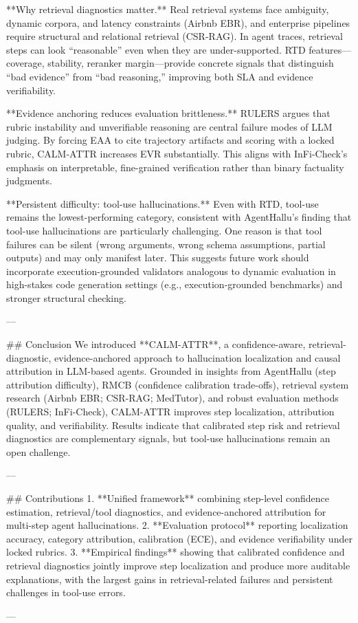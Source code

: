 **Why retrieval diagnostics matter.** Real retrieval systems face ambiguity, dynamic corpora, and latency constraints (Airbnb EBR), and enterprise pipelines require structural and relational retrieval (CSR-RAG). In agent traces, retrieval steps can look “reasonable” even when they are under-supported. RTD features—coverage, stability, reranker margin—provide concrete signals that distinguish “bad evidence” from “bad reasoning,” improving both SLA and evidence verifiability.

**Evidence anchoring reduces evaluation brittleness.** RULERS argues that rubric instability and unverifiable reasoning are central failure modes of LLM judging. By forcing EAA to cite trajectory artifacts and scoring with a locked rubric, CALM-ATTR increases EVR substantially. This aligns with InFi-Check’s emphasis on interpretable, fine-grained verification rather than binary factuality judgments.

**Persistent difficulty: tool-use hallucinations.** Even with RTD, tool-use remains the lowest-performing category, consistent with AgentHallu’s finding that tool-use hallucinations are particularly challenging. One reason is that tool failures can be silent (wrong arguments, wrong schema assumptions, partial outputs) and may only manifest later. This suggests future work should incorporate execution-grounded validators analogous to dynamic evaluation in high-stakes code generation settings (e.g., execution-grounded benchmarks) and stronger structural checking.

---

## Conclusion  
We introduced **CALM-ATTR**, a confidence-aware, retrieval-diagnostic, evidence-anchored approach to hallucination localization and causal attribution in LLM-based agents. Grounded in insights from AgentHallu (step attribution difficulty), RMCB (confidence calibration trade-offs), retrieval system research (Airbnb EBR; CSR-RAG; MedTutor), and robust evaluation methods (RULERS; InFi-Check), CALM-ATTR improves step localization, attribution quality, and verifiability. Results indicate that calibrated step risk and retrieval diagnostics are complementary signals, but tool-use hallucinations remain an open challenge.

---

## Contributions  
1. **Unified framework** combining step-level confidence estimation, retrieval/tool diagnostics, and evidence-anchored attribution for multi-step agent hallucinations.  
2. **Evaluation protocol** reporting localization accuracy, category attribution, calibration (ECE), and evidence verifiability under locked rubrics.  
3. **Empirical findings** showing that calibrated confidence and retrieval diagnostics jointly improve step localization and produce more auditable explanations, with the largest gains in retrieval-related failures and persistent challenges in tool-use errors.

---